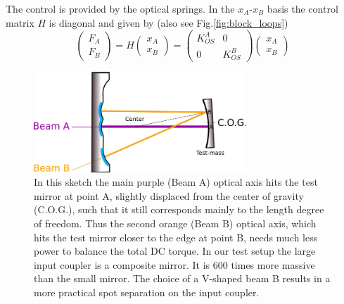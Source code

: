 The control is provided by the optical springs. In the $x_A$-$x_B$ basis the control matrix $H$ is diagonal and given by  (also see Fig.\ref{fig:block_loops})
\begin{equation}
\begin{pmatrix}
F_{A}\\ F_{B}
\end{pmatrix}
= H
 \begin{pmatrix}
x_A\\ x_B
\end{pmatrix} 
=  \begin{pmatrix}
K_{OS}^A & 0 \\ 0 & K_{OS}^B
\end{pmatrix} 
 \begin{pmatrix}
x_A\\ x_B
\end{pmatrix} 
\label{eq:HX}
\end{equation}

\begin{figure}[t]
	\centering
		\includegraphics[width=8cm]{./figures/trap_drawing_paper2.pdf}
	\caption{
	In this sketch the main purple (Beam A) optical axis hits the test mirror %
	at point A, slightly displaced from the center of gravity (C.O.G.), such
	 that it still corresponds mainly to the length degree of freedom. Thus the second orange (Beam B) optical axis, which hits the test mirror closer to the edge at point B, needs much less power to balance the total DC torque. In our test setup the large input coupler is a composite mirror. It is 600 times more massive than the small mirror. The choice of a V-shaped beam B results in a more practical spot separation on the input coupler. }	


	
	\label{fig:angular}
\end{figure}




